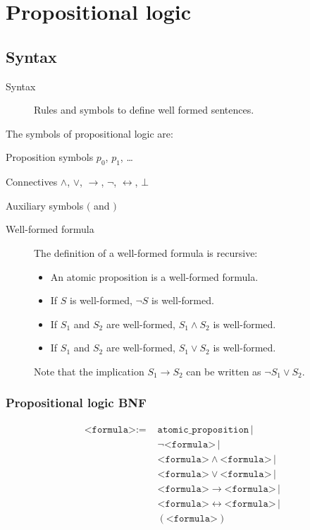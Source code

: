 \chapter{Propositional logic}

\section{Syntax}
\begin{description}
    \item[Syntax] 
        Rules and symbols to define well formed sentences.
\end{description}

The symbols of propositional logic are:
\begin{descriptionlist}
    \item[Proposition symbols] $p_0$, $p_1$, \dots
    \item[Connectives] $\land$, $\vee$, $\rightarrow$, $\lnot$, $\leftrightarrow$, $\bot$
    \item[Auxiliary symbols] $($ and $)$
\end{descriptionlist}

\begin{description}
    \item[Well-formed formula] 
        The definition of a well-formed formula is recursive:
        \begin{itemize}
            \item An atomic proposition is a well-formed formula.
            \item If $S$ is well-formed, $\lnot S$ is well-formed.
            \item If $S_1$ and $S_2$ are well-formed, $S_1 \land S_2$ is well-formed.
            \item If $S_1$ and $S_2$ are well-formed, $S_1 \vee S_2$ is well-formed.
        \end{itemize}

        Note that the implication $S_1 \rightarrow S_2$ can be written as $\lnot S_1 \vee S_2$.
\end{description}

\subsection{Propositional logic BNF}
\[ 
    \begin{split}
        \texttt{<formula>} :=\,\, &\texttt{atomic\_proposition} \,|\,\\
            &\lnot \texttt{<formula>} \,|\, \\
            &\texttt{<formula>} \land \texttt{<formula>} \,|\, \\
            &\texttt{<formula>} \vee \texttt{<formula>} \,|\, \\
            &\texttt{<formula>} \rightarrow \texttt{<formula>} \,|\, \\
            &\texttt{<formula>} \leftrightarrow \texttt{<formula>} \,|\, \\
            &(\texttt{<formula>}) \\
    \end{split}
\]



